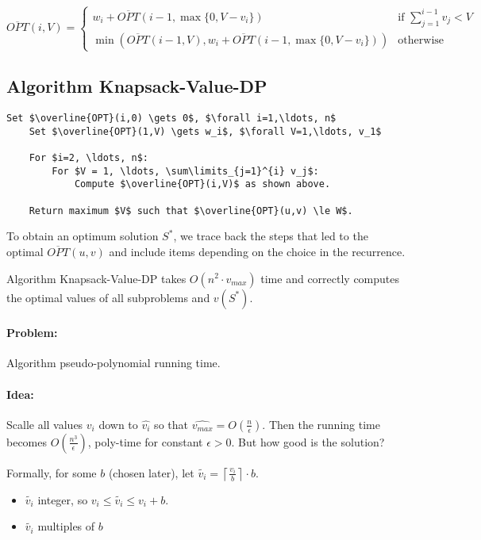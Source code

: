 $$\overline{OPT}(i,V) = \left\{
	\begin{array}{ll}
		w_i + \overline{OPT}(i-1, \max \{0, V-v_i\})  & \mbox{if } \sum\limits_{j=1}^{i-1} v_j < V \\
		\min( \overline{OPT}(i-1, V), w_i + \overline{OPT}(i-1, \max\{0, V-v_i\})) & \mbox{otherwise}
	\end{array}
\right.$$

\subsection{Algorithm Knapsack-Value-DP}

\begin{lstlisting}[mathescape]
	Set $\overline{OPT}(i,0) \gets 0$, $\forall i=1,\ldots, n$
	Set	$\overline{OPT}(1,V) \gets w_i$, $\forall V=1,\ldots, v_1$
	
	For $i=2, \ldots, n$:
		For $V = 1, \ldots, \sum\limits_{j=1}^{i} v_j$:
			Compute $\overline{OPT}(i,V)$ as shown above.
	
	Return maximum $V$ such that $\overline{OPT}(u,v) \le W$.
\end{lstlisting}

To obtain an optimum solution $S^*$, we trace back the steps that led to the optimal $\overline{OPT}(u,v)$ and include items depending on the choice in the recurrence.

\begin{mytheorem}
	Algorithm Knapsack-Value-DP takes $O(n^2 \cdot v_{max})$ time and correctly computes the optimal values of all subproblems and $v(S^*)$.	
\end{mytheorem}

\paragraph{Problem:} Algorithm pseudo-polynomial running time.

\paragraph{Idea:} Scalle all values $v_i$ down to $\hat{v_i}$ so that $\hat{v_{max}} = O(\frac{n}{\epsilon})$. Then the running time becomes $O(\frac{n^3}{\epsilon})$, poly-time for constant $\epsilon > 0$. But how good is the solution?

Formally, for some $b$ (chosen later), let $\tilde{v_i} = \left \lceil \frac{v_i}{b} \right \rceil \cdot b$.
\begin{itemize}
	\item $\tilde{v_i}$ integer, so $v_i \le \tilde{v_i} \le v_i + b$.
	\item $\tilde{v_i}$ multiples of $b$
\end{itemize}

